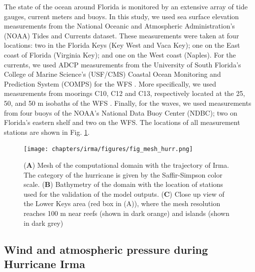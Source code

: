 The state of the ocean around Florida is monitored by an extensive array of tide gauges, current meters and buoys. In this study, we used sea surface elevation measurements from the National Oceanic and Atmospheric Administration’s (NOAA) Tides and Currents dataset. These measurements were taken at four locations: two in the Florida Keys (Key West and Vaca Key); one on the East coast of Florida (Virginia Key); and one on the West coast (Naples). For the currents, we used ADCP measurements from the University of South Florida's College of Marine Science's (USF/CMS) Coastal Ocean Monitoring and Prediction System (COMPS) for the WFS \citep{weisberg2009mean}. More specifically, we used measurements from moorings C10, C12 and C13, respectively located at the 25, 50, and 50 m isobaths of the WFS \citep{liu2020impacts}. Finally, for the waves, we used measurements from four buoys of the NOAA's National Data Buoy Center (NDBC); two on Florida's eastern shelf and two on the WFS. The locations of all measurement stations are shown in Fig. \ref{fig:mesh}.

\begin{figure}
    \centering
    \texttt{[image: chapters/irma/figures/fig\_mesh\_hurr.png]}
    \caption{(\textbf{A}) Mesh of the computational domain with the trajectory of Irma. The category of the hurricane is given by the Saffir-Simpson color scale. (\textbf{B}) Bathymetry of the domain with the location of stations used for the validation of the model outputs. (\textbf{C}) Close up view of the Lower Keys area (red box in (A)), where the mesh resolution reaches 100 m near reefs (shown in dark orange) and islands (shown in dark grey)}
    \label{fig:mesh}
\end{figure}

\subsection{Wind and atmospheric pressure during Hurricane Irma}

